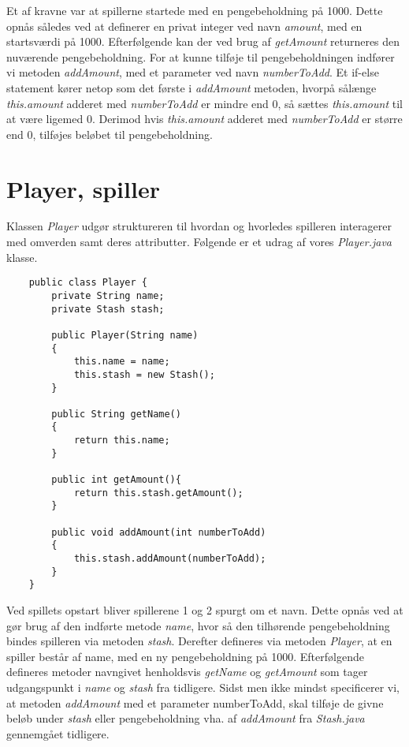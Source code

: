 \noindent Et af kravne var at spillerne startede med en pengebeholdning på 1000.
Dette opnås således ved at definerer en privat integer ved navn \textit{amount}, med en startsværdi på 1000.
Efterfølgende kan der ved brug af \textit{getAmount} returneres den nuværende pengebeholdning.
For at kunne tilføje til pengebeholdningen indfører vi metoden \textit{addAmount}, med et parameter ved navn \textit{numberToAdd}.
Et if-else statement kører netop som det første i \textit{addAmount} metoden, hvorpå sålænge \textit{this.amount} adderet med \textit{numberToAdd} er mindre end 0, så sættes \textit{this.amount} til at være ligemed 0.
Derimod hvis \textit{this.amount} adderet med \textit{numberToAdd} er større end 0, tilføjes beløbet til pengebeholdning.\\

\section{Player, spiller}
\noindent Klassen \textit{Player} udgør struktureren til hvordan og hvorledes spilleren interagerer med omverden samt deres attributter.
Følgende er et udrag af vores \textit{Player.java} klasse.\\
\begin{lstlisting}
    public class Player {
        private String name;
        private Stash stash;
    
        public Player(String name)
        {
            this.name = name;
            this.stash = new Stash();
        }
    
        public String getName()
        {
            return this.name;
        }
    
        public int getAmount(){
            return this.stash.getAmount();
        }
    
        public void addAmount(int numberToAdd)
        {
            this.stash.addAmount(numberToAdd);
        }
    }     
\end{lstlisting}
\vspace{2ex}

\noindent Ved spillets opstart bliver spillerene 1 og 2 spurgt om et navn.
Dette opnås ved at gør brug af den indførte metode \textit{name}, hvor så den tilhørende pengebeholdning bindes spilleren via metoden \textit{stash}.
Derefter defineres via metoden \textit{Player}, at en spiller består af name, med en ny pengebeholdning på 1000.
Efterfølgende defineres metoder navngivet henholdsvis \textit{getName} og \textit{getAmount} som tager udgangspunkt i \textit{name} og \textit{stash} fra tidligere.
Sidst men ikke mindst specificerer vi, at metoden \textit{addAmount} med et parameter {numberToAdd}, skal tilføje de givne beløb under \textit{stash} eller pengebeholdning vha. af \textit{addAmount} fra \textit{Stash.java} gennemgået tidligere.\\


